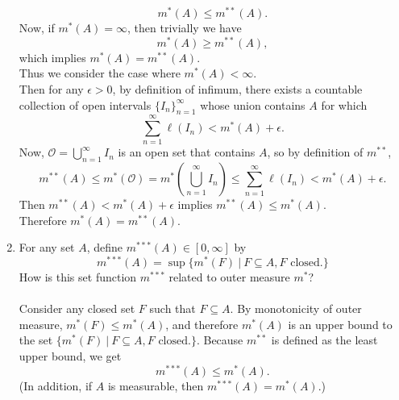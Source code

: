 \begin{enumerate}
	\[
		m^*(A)\le m^{**}(A).
	\]
	Now, if $m^*(A)=\infty$, then trivially we have
	\[
		m^*(A)\ge m^{**}(A),
	\]
	which implies $m^*(A)= m^{**}(A)$.\\
	Thus we consider the case where $m^*(A)<\infty$.\\
	Then for any $\epsilon>0$, by definition of infimum, there exists a countable collection of open intervals $\{I_n\}_{n=1}^\infty$ whose union contains $A$ for which 
	\[
		\sum_{n=1}^\infty \ell(I_n) <m^*(A)+\epsilon.
	\]
	Now, $\mathcal{O}=\bigcup_{n=1}^\infty I_n$ is an open set that contains $A$, so by definition of $m^{**}$,
	\[
		m^{**}(A)\le m^*(\mathcal{O})=m^*(\bigcup_{n=1}^\infty I_n)\le\sum_{n=1}^\infty \ell(I_n) <m^*(A)+\epsilon.
	\]
	Then $m^{**}(A)<m^*(A)+\epsilon$ implies $m^{**}(A)\le m^*(A)$.\\
	Therefore $m^*(A)= m^{**}(A)$.
	\item For any set $A$, define $m^{***}(A)\in[0,\infty]$ by
	\[
		m^{***}(A)=\sup\{m^*(F)\ |\ F\subseteq A, F\text{ closed.}\}	
	\]
	How is this set function $m^{***}$ related to outer measure $m^*$?\\
	\\Consider any closed set $F$ such that $F\subseteq A$.
	By monotonicity of outer measure, $m^*(F)\le m^*(A)$, and therefore $m^*(A)$ is an upper bound to the set $\{m^*(F)\ |\ F\subseteq A, F\text{ closed.}\}$.
	Because $m^{**}$ is defined as the least upper bound, we get
	\[
		m^{***}(A)\le m^*(A).
	\]
	(In addition, if $A$ is measurable, then $m^{***}(A)= m^*(A)$.)
\end{enumerate}

